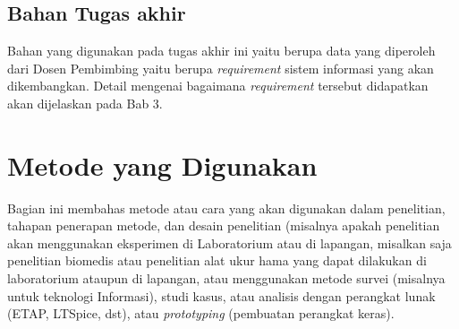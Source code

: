 \subsection{Bahan Tugas akhir}

Bahan yang digunakan pada tugas akhir ini yaitu berupa data yang diperoleh dari Dosen 
Pembimbing yaitu berupa \textit{requirement} sistem informasi yang akan dikembangkan. 
Detail mengenai bagaimana \textit{requirement} tersebut didapatkan akan dijelaskan pada Bab 3.




\section{Metode yang Digunakan}

Bagian ini membahas metode atau cara yang akan digunakan dalam penelitian, tahapan 
penerapan metode, dan desain penelitian (misalnya apakah penelitian akan menggunakan 
eksperimen di Laboratorium atau di lapangan, misalkan saja penelitian biomedis atau 
penelitian alat ukur hama yang dapat dilakukan di laboratorium ataupun di lapangan, atau menggunakan metode survei (misalnya untuk teknologi Informasi), studi kasus, atau analisis dengan perangkat lunak (ETAP, LTSpice, dst), atau \textit{prototyping} (pembuatan perangkat keras).

